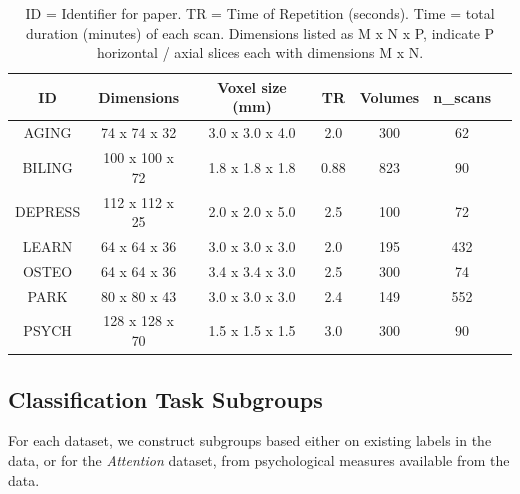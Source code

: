 \documentclass[12pt]{spieman}  %
\begin{document}
\begin{spacing}{2}
\begin{table}[h!]
\caption{
    ID = Identifier for paper. TR = Time of Repetition (seconds).
    Time = total duration (minutes) of each scan. Dimensions listed as M x N x P,
    indicate P horizontal / axial slices each with dimensions M x N.
}
\label{table:1}
\small
\centering
\begin{tabular}{ c c c c c c c }
\hline
\textbf{ID}    & \textbf{Dimensions}  & \textbf{Voxel size (mm)} & \textbf{TR} & \textbf{Volumes} & \textbf{n\_scans} \\
\hline
AGING     & 74 x 74 x 32   & 3.0 x 3.0 x 4.0 & 2.0  & 300 & 62  \\
BILING    & 100 x 100 x 72 & 1.8 x 1.8 x 1.8 & 0.88 & 823 & 90  \\
DEPRESS   & 112 x 112 x 25 & 2.0 x 2.0 x 5.0 & 2.5  & 100 & 72  \\
LEARN     & 64 x 64 x 36   & 3.0 x 3.0 x 3.0 & 2.0  & 195 & 432 \\
OSTEO     & 64 x 64 x 36   & 3.4 x 3.4 x 3.0 & 2.5  & 300 & 74  \\
PARK      & 80 x 80 x 43   & 3.0 x 3.0 x 3.0 & 2.4  & 149 & 552 \\
PSYCH     & 128 x 128 x 70 & 1.5 x 1.5 x 1.5 & 3.0  & 300 & 90  \\
\hline
\end{tabular}

\subsection{Classification Task Subgroups}

For each dataset, we construct subgroups based either on existing labels in the
data, or for the \textit{Attention} dataset, from psychological measures available
from the data.


\end{table}


\end{spacing}
\end{document}
